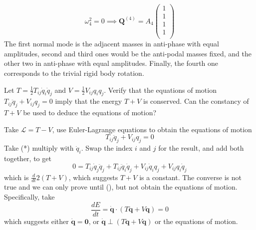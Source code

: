 \documentclass[a4paper]{article}
\begin{document}
\begin{ans}
$$\omega_4^2=0\implies\mathbf{Q}^{(4)}=A_4\begin{pmatrix}1\\1\\1\\1\\\end{pmatrix}$$
The first normal mode is the adjacent masses in anti-phase with equal amplitudes, second and third ones would be the anti-podal masses fixed, and the other two in anti-phase with equal amplitudes. Finally, the fourth one corresponds to the trivial rigid body rotation.
\end{ans}
\begin{qns}[Lagrangian]
Let $T=\frac{1}{2}T_{ij}\dot{q}_i\dot{q}_j$ and $V=\frac{1}{2}V_{ij}q_iq_j$. Verify that the equations of motion $T_{ij}\ddot{q}_j+V_{ij}q_j=0$ imply that the energy $T +V$ is conserved. Can the constancy of $T +V$ be used to deduce the equations of motion?
\end{qns}
\begin{ans}
Take $\mathcal{L}=T-V$, use Euler-Lagrange equations to obtain the equations of motion 
\begin{equation}
    T_{ij}\ddot{q}_j+V_{ij}q_j=0\tag{*}
\end{equation}
Take (*) multiply with $\dot{q}_i$. Swap the index $i$ and $j$ for the result, and add both together, to get
\begin{equation}
    0=T_{ij}\dot{q}_j\ddot{q}_j+T_{ij}\ddot{q}_i\dot{q}_j+V_{ij}\dot{q}_iq_j+V_{ij}q_i\dot{q}_j\tag{\dag}
\end{equation}
which is $\frac{d}{dt}2(T+V)$, which suggests $T+V$ is a constant. The converse is not true and we can only prove until (\dag), but not obtain the equations of motion. Specifically, take
$$\frac{dE}{dt}=\mathbf{\dot{q}}\cdot(T\mathbf{\ddot{q}}+V\mathbf{q})=0$$
which suggests either $\mathbf{\dot{q}}=\boldsymbol{0}$, or $\mathbf{\dot{q}}\perp(T\mathbf{\ddot{q}}+V\mathbf{q})$ or the equations of motion.
\end{ans}
\newpage
\end{document}
